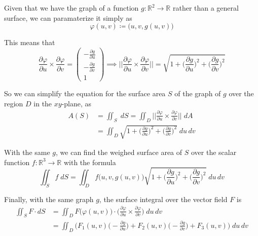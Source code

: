 	\begin{theorem}
		Given that we have the graph of a function $g: \mathbb{R}^2 \to \mathbb{R}$ rather than a general surface, we can paramaterize it simply as
		\begin{equation}
			\varphi(u, v) \coloneqq \big(u, v, g(u, v) \big)
		\end{equation}
		
		This means that 
		\begin{equation}
			\frac{\partial \varphi}{\partial u} \times \frac{\partial \varphi}{\partial v} = 
			\begin{pmatrix}
			-\frac{\partial g}{\partial u} \\ -\frac{\partial g}{\partial v} \\ 1
			\end{pmatrix} \implies \bigg|\bigg|\frac{\partial \varphi}{\partial u} \times \frac{\partial \varphi}{\partial v} \bigg|\bigg| = \sqrt{1 + \Big(\frac{\partial g}{\partial u}\Big)^2 + \Big( \frac{\partial g}{\partial v}\Big)^2}
		\end{equation}
		
		So we can simplify the equation for the surface area $S$ of the graph of $g$ over the region $D$ in the $x y$-plane, as 
		\begin{align}
			A(S) & = \iint_S \; d S = \iint_D \bigg|\bigg|\frac{\partial \varphi}{\partial u} \times \frac{\partial \varphi}{\partial v} \bigg|\bigg| \; d A \\
			& = \iint_D \sqrt{1 + \Big(\frac{\partial g}{\partial u}\Big)^2 + \Big( \frac{\partial g}{\partial v}\Big)^2} \; d u \, d v
		\end{align}
		
		With the same $g$, we can find the weighed surface area of $S$ over the scalar function $f: \mathbb{R}^3 \to \mathbb{R}$ with the formula
		\begin{equation}
			\iint_S f \; d S = \iint_D f\big(u, v, g(u, v)\big) \sqrt{1 + \Big(\frac{\partial g}{\partial u}\Big)^2 + \Big( \frac{\partial g}{\partial v}\Big)^2} \; d u \, d v
		\end{equation}
		
		Finally, with the same graph $g$, the surface integral over the vector field $F$ is
		\begin{align}
			\iint_S F \cdot d S & = \iint_D F\big(\varphi(u, v)\big) \cdot \bigg( \frac{\partial \varphi}{\partial u} \times \frac{\partial \varphi}{\partial v}\bigg) \; d u \, d v \\
			& = \iint_D \bigg( F_1(u, v) \Big(- \frac{\partial g}{\partial u}\Big) + F_2 (u, v) \Big( - \frac{\partial g}{\partial v} \Big) + F_3 (u, v) \bigg) \; d u \, d v
		\end{align}
	\end{theorem}
		
